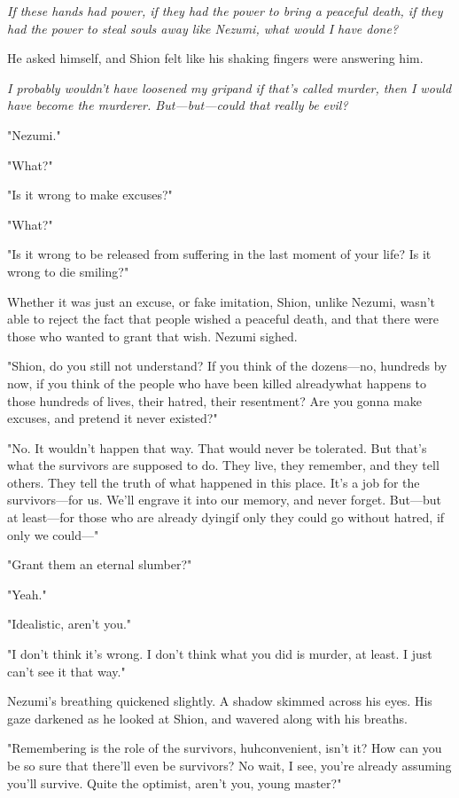\emph{If these hands had power, if they had the power to bring a peaceful
death, if they had the power to steal souls away like Nezumi, what would
I have done?}

He asked himself, and Shion felt like his shaking fingers were answering
him.

\emph{I probably wouldn't have loosened my grip\el and if that's called
murder, then I would have become the murderer. But---but---could that really
be evil?}

"Nezumi."

"What?"

"Is it wrong to make excuses?"

"What?"

"Is it wrong to be released from suffering in the last moment of your
life? Is it wrong to die smiling?"

Whether it was just an excuse, or fake imitation, Shion, unlike Nezumi,
wasn't able to reject the fact that people wished a peaceful death, and
that there were those who wanted to grant that wish. Nezumi sighed.

"Shion, do you still not understand? If you think of the dozens---no,
hundreds by now, if you think of the people who have been killed
already\el what happens to those hundreds of lives, their hatred, their
resentment? Are you gonna make excuses, and pretend it never existed?"

"No. It wouldn't happen that way. That would never be tolerated. But
that's what the survivors are supposed to do. They live, they remember,
and they tell others. They tell the truth of what happened in this
place. It's a job for the survivors---for us. We'll engrave it into our
memory, and never forget. But---but at least---for those who are already
dying\el if only they could go without hatred, if only we could---"

"Grant them an eternal slumber?"

"Yeah."

"Idealistic, aren't you."

"I don't think it's wrong. I don't think what you did is murder, at
least. I just can't see it that way."

Nezumi's breathing quickened slightly. A shadow skimmed across his eyes.
His gaze darkened as he looked at Shion, and wavered along with his
breaths.

"Remembering is the role of the survivors, huh\el convenient, isn't it?
How can you be so sure that there'll even be survivors? No wait, I see,
you're already assuming you'll survive. Quite the optimist, aren't you,
young master?"

